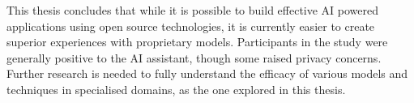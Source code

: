 \begin{scontents}[store-env=abstracts,print-env=true]
This thesis concludes that while it is possible to build effective AI powered applications using open source technologies, it is currently easier to create superior experiences with proprietary models. Participants in the study were generally positive to the AI assistant, though some raised privacy concerns. Further research is needed to fully understand the efficacy of various models and techniques in specialised domains, as the one explored in this thesis.




\end{scontents}












